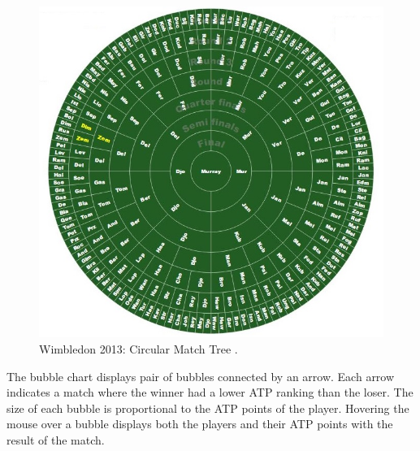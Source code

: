 \documentclass[9pt,twocolumn,twoside]{../../styles/osajnl}
\begin{document}
\begin{figure}[h]
\centering
\includegraphics[scale=0.3]{images/1}
\centering
\caption{Wimbledon 2013: Circular Match Tree \cite{www-cmt}.}
\end{figure}
The bubble chart displays pair of bubbles connected by an arrow. Each arrow indicates a match where the winner had a lower ATP ranking than the loser. The size of each bubble is proportional to the ATP points of the player. Hovering the mouse over a bubble displays both the players and their ATP points with the result of the match.
\end{document}
